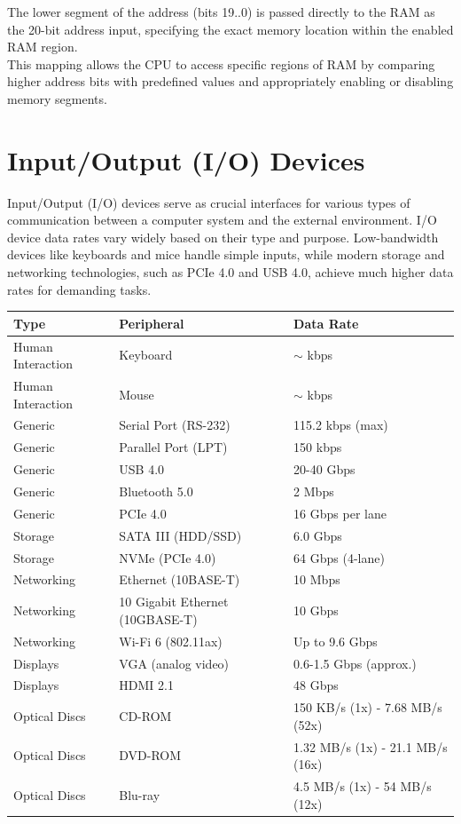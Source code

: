 The lower segment of the address (bits 19..0) is passed directly to the RAM as the 20-bit address input, specifying the exact memory location within the enabled RAM region. \\
\vspace{5px}
This mapping allows the CPU to access specific regions of RAM by comparing higher address bits with predefined values and appropriately enabling or disabling memory segments.
\newpage
\section{Input/Output (I/O) Devices}    
Input/Output (I/O) devices serve as crucial interfaces for various types of communication between a computer system and the external environment. 
I/O device data rates vary widely based on their type and purpose. Low-bandwidth devices like keyboards and mice handle simple inputs, while modern storage and networking technologies, such as PCIe 4.0 and USB 4.0, achieve much higher data rates for demanding tasks.
\begin{center}
    \begin{tabular}{|l|l|l|}
        \hline
        \textbf{Type} & \textbf{Peripheral} & \textbf{Data Rate} \\ \hline
        Human Interaction & Keyboard & $\sim$ kbps \\ \hline
        Human Interaction & Mouse & $\sim$ kbps \\ \hline
        Generic & Serial Port (RS-232) & 115.2 kbps (max) \\ \hline
        Generic & Parallel Port (LPT) & 150 kbps \\ \hline
        Generic & USB 4.0 & 20-40 Gbps \\ \hline
        Generic & Bluetooth 5.0 & 2 Mbps \\ \hline
        Generic & PCIe 4.0 & 16 Gbps per lane \\ \hline
        Storage & SATA III (HDD/SSD) & 6.0 Gbps \\ \hline
        Storage & NVMe (PCIe 4.0) & 64 Gbps (4-lane) \\ \hline
        Networking & Ethernet (10BASE-T) & 10 Mbps \\ \hline
        Networking & 10 Gigabit Ethernet (10GBASE-T) & 10 Gbps \\ \hline
        Networking & Wi-Fi 6 (802.11ax) & Up to 9.6 Gbps \\ \hline
        Displays & VGA (analog video) & 0.6-1.5 Gbps (approx.) \\ \hline
        Displays & HDMI 2.1 & 48 Gbps \\ \hline
        Optical Discs & CD-ROM & 150 KB/s (1x) - 7.68 MB/s (52x) \\ \hline
        Optical Discs & DVD-ROM & 1.32 MB/s (1x) - 21.1 MB/s (16x) \\ \hline
        Optical Discs & Blu-ray & 4.5 MB/s (1x) - 54 MB/s (12x) \\ \hline
    \end{tabular}
\end{center}

